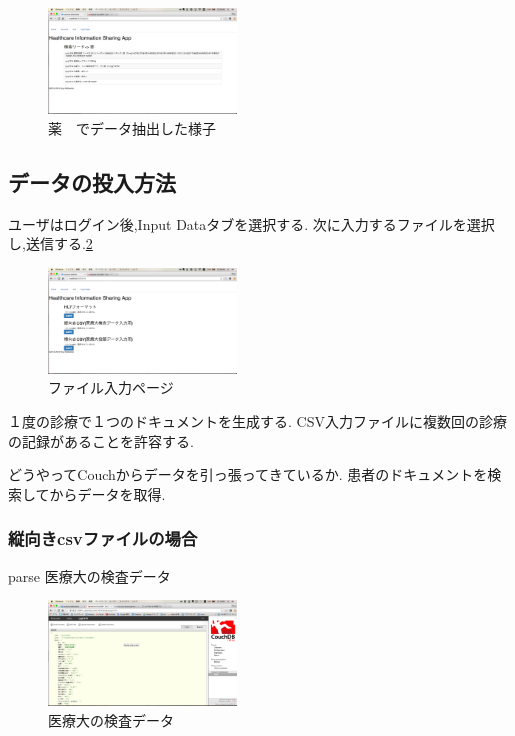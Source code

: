 		\begin{figure}[htbp]
				\includegraphics[width=5cm, bb=0 0 437 688]{./gazou/getdb.png}
			\caption{薬　でデータ抽出した様子}
			\label{ss-mix_sampledata}
		\end{figure}



\subsection{データの投入方法}
	ユーザはログイン後,Input Dataタブを選択する.
	次に入力するファイルを選択し,送信する.\ref{fileiopage}

	\begin{figure}[htbp]
			\includegraphics[width=5cm, bb=0 0 437 688]{./gazou/fileiopage.png}
		\caption{ファイル入力ページ}
		\label{fileiopage}
	\end{figure}

	１度の診療で１つのドキュメントを生成する.
	CSV入力ファイルに複数回の診療の記録があることを許容する.


	どうやってCouchからデータを引っ張ってきているか.
	患者のドキュメントを検索してからデータを取得.


		\subsubsection{縦向きcsvファイルの場合}
			parse
			医療大の検査データ
			\\
			\begin{figure}[htbp]
					\includegraphics[width=5cm, bb=0 0 437 688]{./gazou/kensa.png}
				\caption{医療大の検査データ}
				\label{ss-mix_sampledata}
			\end{figure}

